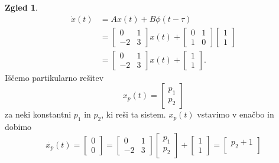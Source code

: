 \documentclass[12pt,a4paper]{amsart}
\theoremstyle{definition} %
\newtheorem{zgled}[definicija]{Zgled}
\theoremstyle{plain} %
\begin{document}
\begin{zgled}
\begin{equation*}
        \begin{split}
            \dot{x}(t) &= Ax(t)+B\phi(t-\tau) \\
            &= \begin{bmatrix}
                0 & 1 \\
                -2 & 3 
            \end{bmatrix}x(t)+\begin{bmatrix}
                0 & 1 \\
                1 & 0 
            \end{bmatrix}
            \begin{bmatrix}
                1  \\
                1  
            \end{bmatrix} \\
            &= \begin{bmatrix}
                0 & 1 \\
                -2 & 3 
            \end{bmatrix}x(t)+
            \begin{bmatrix}
                1  \\
                1  
            \end{bmatrix}.
        \end{split}
    \end{equation*}
    Iščemo partikularno rešitev 
    \[x_p(t)=\begin{bmatrix}
        p_1  \\
        p_2  
    \end{bmatrix}\]
    za neki konstantni $p_1$ in $p_2$, ki reši ta sistem. $x_p(t)$ vstavimo v enačbo in dobimo
    \[\dot{x_p}(t)=\begin{bmatrix}
        0  \\
        0  
    \end{bmatrix} = \begin{bmatrix}
        0 & 1 \\
        -2 & 3 
    \end{bmatrix}
    \begin{bmatrix}
        p_1  \\
        p_2  
    \end{bmatrix} +
    \begin{bmatrix}
        1  \\
        1  
    \end{bmatrix} = 
    \begin{bmatrix}
        p_2+1  \\

\end{bmatrix}\]
\end{zgled}
\end{document}

